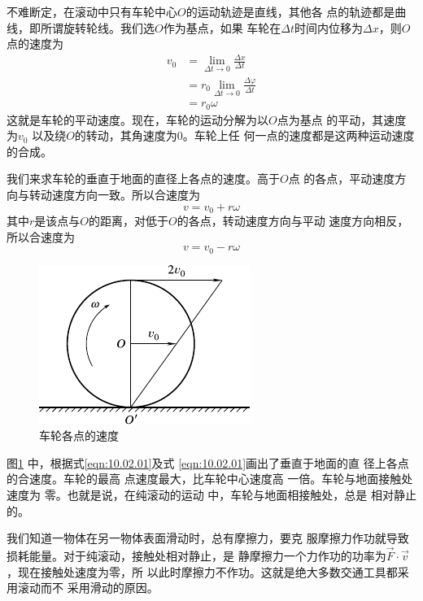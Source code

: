 \clearpage\noindent
不难断定，在滚动中只有车轮中心$ O $的运动轨迹是直线，其他各
点的轨迹都是曲线，即所谓旋转轮线。我们选$ O $作为基点，如果
车轮在$ \Delta t $时间内位移为$ \Delta x $，则$ O $点的速度为
\begin{equation*}
  \begin{split}
    v _ { 0 } &= \lim_{ \Delta t \to 0 } \frac { \Delta x } { \Delta t} \\
    &= r_ { 0 } \lim_{ \Delta t \to 0 } \frac { \Delta \varphi } { \Delta t } \\
    &= r _ { 0 } \omega
  \end{split}
\end{equation*}
这就是车轮的平动速度。现在，车轮的运动分解为以$ O $点为基点
的平动，其速度为$ v _ { 0 } $ 以及绕$ O $的转动，其角速度为$ 0 $。车轮上任
何一点的速度都是这两种运动速度的合成。

我们来求车轮的垂直于地面的直径上各点的速度。高于$ O $点
的各点，平动速度方向与转动速度方向一致。所以合速度为
\begin{equation}\label{eqn:10.02.01}
  v = v _ { 0 } + r \omega
\end{equation}
其中$ r $是该点与$ O $的距离，对低于$ O $的各点，转动速度方向与平动
速度方向相反，所以合速度为
\begin{equation}\label{eqn:10.02.02}
  v = v _ { 0 } - r \omega
\end{equation}
\begin{figure}
  \vspace{-0.8em}
  \centering
  \includegraphics{figure/fig10.10}
  \caption{车轮各点的速度}
  \label{fig:10.10}
\end{figure}
图\ref{fig:10.10} 中，根据式\eqref{eqn:10.02.01}及式
\eqref{eqn:10.02.01}画出了垂直于地面的直
径上各点的合速度。车轮的最高
点速度最大，比车轮中心速度高
一倍。车轮与地面接触处速度为
零。也就是说，在纯滚动的运动
中，车轮与地面相接触处，总是
相对静止的。

我们知道一物体在另一物体表面滑动时，总有摩擦力，要克
服摩擦力作功就导致损耗能量。对于纯滚动，接触处相对静止，是
静摩擦力一个力作功的功率为$ \vec{F} \cdot \vec{v} $，现在接触处速度为零，所
以此时摩擦力不作功。这就是绝大多数交通工具都采用滚动而不
采用滑动的原因。

